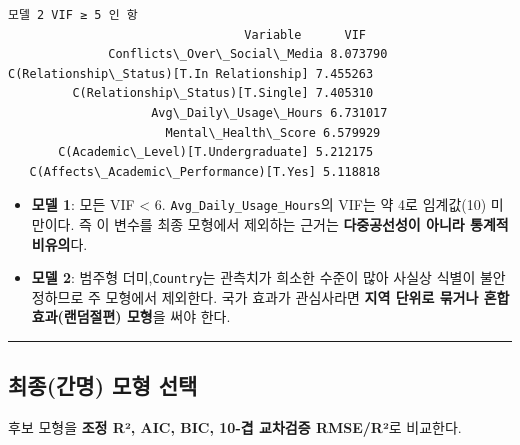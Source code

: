 \documentclass[11pt]{article}
\providecommand{\tightlist}{%
      \setlength{\itemsep}{0pt}\setlength{\parskip}{0pt}}
\begin{document}
    \begin{Verbatim}[commandchars=\\\{\}]
모델 2 VIF ≥ 5 인 항
                                 Variable      VIF
              Conflicts\_Over\_Social\_Media 8.073790
C(Relationship\_Status)[T.In Relationship] 7.455263
         C(Relationship\_Status)[T.Single] 7.405310
                    Avg\_Daily\_Usage\_Hours 6.731017
                      Mental\_Health\_Score 6.579929
       C(Academic\_Level)[T.Undergraduate] 5.212175
   C(Affects\_Academic\_Performance)[T.Yes] 5.118818
    \end{Verbatim}

    \begin{itemize}
\tightlist
\item
  \textbf{모델 1}: 모든 VIF \textless{} 6.
  \texttt{Avg\_Daily\_Usage\_Hours}의 VIF는 약 4로 임계값(10) 미만이다.
  즉 이 변수를 최종 모형에서 제외하는 근거는 \textbf{다중공선성이 아니라
  통계적 비유의}다.
\item
  \textbf{모델 2}: 범주형 더미,\texttt{Country}는 관측치가 희소한 수준이
  많아 사실상 식별이 불안정하므로 주 모형에서 제외한다. 국가 효과가
  관심사라면 \textbf{지역 단위로 묶거나 혼합효과(랜덤절편) 모형}을 써야
  한다.
\end{itemize}

    \begin{center}\rule{0.5\linewidth}{0.5pt}\end{center}

\hypertarget{uxcd5cuxc885uxac04uxba85-uxbaa8uxd615-uxc120uxd0dd}{%
\subsection{최종(간명) 모형
선택}\label{uxcd5cuxc885uxac04uxba85-uxbaa8uxd615-uxc120uxd0dd}}

후보 모형을 \textbf{조정 R², AIC, BIC, 10-겹 교차검증 RMSE/R²}로
비교한다.
\end{document}
